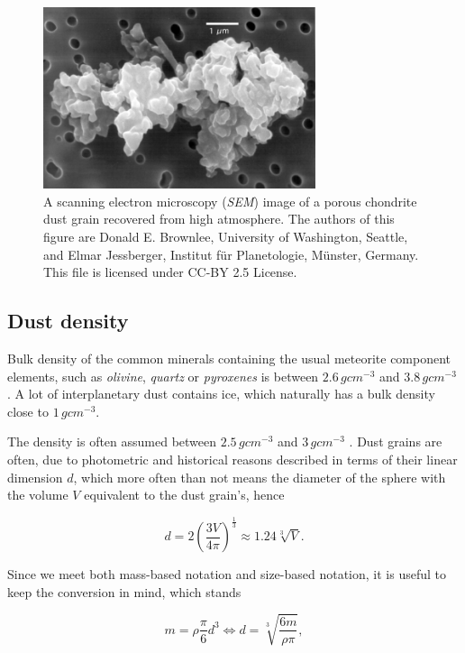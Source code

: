 \begin{figure}[h]
 	\centering
 	\includegraphics[width=8cm]{figures/grain.jpg}
 	\caption{A scanning electron microscopy (\textit{SEM}) image of a porous chondrite dust grain recovered from high atmosphere.  The authors of this figure are Donald E. Brownlee, University of Washington, Seattle, and Elmar Jessberger, Institut für Planetologie, Münster, Germany.
This file is licensed under CC-BY 2.5 License.}
 	\label{fig:dust_grain}
\end{figure}

\subsection{Dust density}

Bulk density of the common minerals containing the usual meteorite component elements, such as \textit{olivine}, \textit{quartz} or \textit{pyroxenes} is between $2.6 \, \si{g cm^{-3}}$ and $3.8 \, \si{g cm^{-3}}$ \citep{duda1986minerals}. A lot of interplanetary dust contains ice, which naturally has a bulk density close to $1 \, \si{g cm^{-3}}$.

The density is often assumed between $2.5 \, \si{g cm^{-3}}$ \citep{mann2014dust} and $3 \, \si{g cm^{-3}}$ \citep{mcdonnell1984cosmic}. Dust grains are often, due to photometric and historical reasons described in terms of their linear dimension $d$, which more often than not means the diameter of the sphere with the volume $V$ equivalent to the dust grain's, hence

\begin{equation}
    d = 2 \left( {\frac{3V}{4\pi}} \right)^{\frac{1}{3}} \approx 1.24 \sqrt[3]{V}.
\end{equation}

Since we meet both mass-based notation and size-based notation, it is useful to keep the conversion in mind, which stands

\begin{equation}
    m = \rho \frac{\pi}{6} d^3 \Leftrightarrow d = \sqrt[3]{\frac{6 m}{\rho \pi}},
\end{equation}

